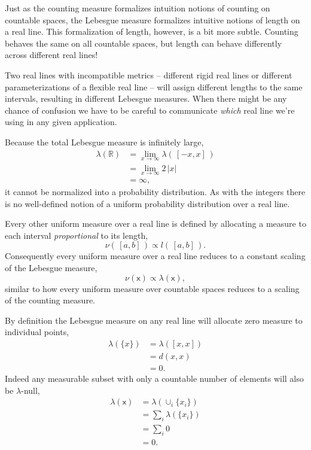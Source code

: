 \documentclass[
  letterpaper,
  DIV=11,
  numbers=noendperiod]{scrartcl}
\begin{document}
Just as the counting measure formalizes intuition notions of counting on
countable spaces, the Lebesgue measure formalizes intuitive notions of
length on a real line. This formalization of length, however, is a bit
more subtle. Counting behaves the same on all countable spaces, but
length can behave differently across different real lines!

Two real lines with incompatible metrics -- different rigid real lines
or different parameterizations of a flexible real line -- will assign
different lengths to the same intervals, resulting in different Lebesgue
measures. When there might be any chance of confusion we have to be
careful to communicate \emph{which} real line we're using in any given
application.

Because the total Lebesgue measure is infinitely large, \begin{align*}
\lambda(\mathbb{R})
&=
\lim_{x \rightarrow \infty} \lambda( \, [-x, x] \, )
\\
&=
\lim_{x \rightarrow \infty} 2 \, | x |
\\
&=
\infty,
\end{align*} it cannot be normalized into a probability distribution. As
with the integers there is no well-defined notion of a uniform
probability distribution over a real line.

Every other uniform measure over a real line is defined by allocating a
measure to each interval \emph{proportional} to its length, \[
\nu( \, [a, b] \, ) \propto l( \, [a, b] \, ).
\] Consequently every uniform measure over a real line reduces to a
constant scaling of the Lebesgue measure, \[
\nu ( \mathsf{x} ) \propto \lambda ( \mathsf{x} ),
\] similar to how every uniform measure over countable spaces reduces to
a scaling of the counting measure.

By definition the Lebesgue measure on any real line will allocate zero
measure to individual points, \begin{align*}
\lambda(\{ x \})
&= \lambda([x, x])
\\
&= d(x, x)
\\
&= 0.
\end{align*} Indeed any measurable subset with only a countable number
of elements will also be \(\lambda\)-null, \begin{align*}
\lambda(\mathsf{x})
&=
\lambda(\cup_{i} \{ x_{i} \} )
\\
&=
\sum_{i} \lambda( \{ x_{i} \} )
\\
&=
\sum_{i} 0
\\
&=
0.
\end{align*}
\end{document}
